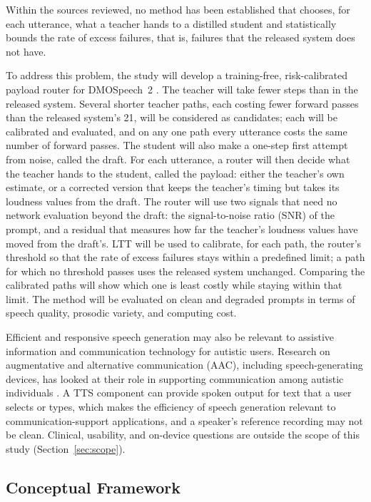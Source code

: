 Within the sources reviewed, no method has been established that chooses, for each utterance, what a teacher hands to a distilled student and statistically bounds the rate of excess failures, that is, failures that the released system does not have.

To address this problem, the study will develop a training-free, risk-calibrated payload router for DMOSpeech~2 \parencite{li2025dmospeech2}. The teacher will take fewer steps than in the released system. Several shorter teacher paths, each costing fewer forward passes than the released system's 21, will be considered as candidates; each will be calibrated and evaluated, and on any one path every utterance costs the same number of forward passes. The student will also make a one-step first attempt from noise, called the draft. For each utterance, a router will then decide what the teacher hands to the student, called the payload: either the teacher's own estimate, or a corrected version that keeps the teacher's timing but takes its loudness values from the draft. The router will use two signals that need no network evaluation beyond the draft: the signal-to-noise ratio (SNR) of the prompt, and a residual that measures how far the teacher's loudness values have moved from the draft's. LTT will be used to calibrate, for each path, the router's threshold so that the rate of excess failures stays within a predefined limit; a path for which no threshold passes uses the released system unchanged. Comparing the calibrated paths will show which one is least costly while staying within that limit. The method will be evaluated on clean and degraded prompts in terms of speech quality, prosodic variety, and computing cost.

Efficient and responsive speech generation may also be relevant to assistive information and communication technology for autistic users. Research on augmentative and alternative communication (AAC), including speech-generating devices, has looked at their role in supporting communication among autistic individuals \parencite{muharib2024sgd,therrien2025sgd}. A TTS component can provide spoken output for text that a user selects or types, which makes the efficiency of speech generation relevant to communication-support applications, and a speaker's reference recording may not be clean. Clinical, usability, and on-device questions are outside the scope of this study (Section~\ref{sec:scope}).

\subsection{Conceptual Framework}
\label{sec:conceptual}

